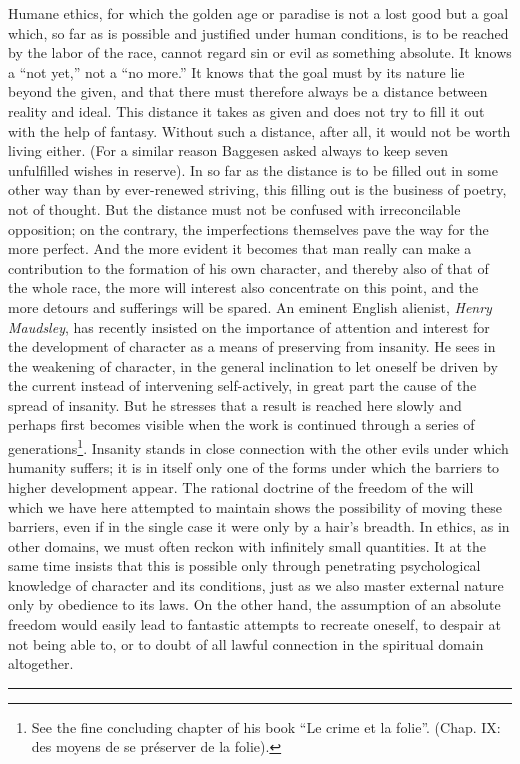\documentclass[12pt,a4paper,openany]{book}
\newcommand{\opage}[1]{\marginnote{\footnotesize\textit{[#1]}}}
\begin{document}
Humane ethics, for which the golden age or paradise is not a lost good but a
goal which, \opage{145}so far as is possible and justified under human
conditions, is to be reached by the labor of the race, cannot regard sin or
evil as something absolute. It knows a ``not yet,'' not a ``no more.'' It
knows that the goal must by its nature lie beyond the given, and that there
must therefore always be a distance between reality and ideal. This distance
it takes as given and does not try to fill it out with the help of fantasy.
Without such a distance, after all, it would not be worth living either.
(For a similar reason Baggesen asked always to keep seven unfulfilled wishes
in reserve). In so far as the distance is to be filled out in some other way
than by ever-renewed striving, this filling out is the business of poetry,
not of thought. But the distance must not be confused with irreconcilable
opposition; on the contrary, the imperfections themselves pave the way for
the more perfect. And the more evident it becomes that man really can make a
contribution to the formation of his own character, and thereby also of that
of the whole race, the more will interest also concentrate on this point,
and the more detours and sufferings will be spared. An eminent English
alienist, \emph{Henry Maudsley}, has recently insisted on the importance of
attention and interest for the development of character as a means of
preserving from insanity. He sees in the weakening of character, in the
general inclination to let oneself be driven by the current instead of
intervening self-actively, in great part the cause of the spread of
insanity. But he stresses that a \opage{146}result is reached here slowly
and perhaps first becomes visible when the work is continued through a
series of generations\footnote[1]{See the fine concluding chapter of his
book ``Le crime et la folie''. (Chap. IX: des moyens de se préserver de la
folie).}. Insanity stands in close connection with the other evils under
which humanity suffers; it is in itself only one of the forms under which
the barriers to higher development appear. The rational doctrine of the
freedom of the will which we have here attempted to maintain shows the
possibility of moving these barriers, even if in the single case it were
only by a hair's breadth. In ethics, as in other domains, we must often
reckon with infinitely small quantities. It at the same time insists that
this is possible only through penetrating psychological knowledge of
character and its conditions, just as we also master external nature only by
obedience to its laws. On the other hand, the assumption of an absolute
freedom would easily lead to fantastic attempts to recreate oneself, to
despair at not being able to, or to doubt of all lawful connection in the
spiritual domain altogether.

\begin{center}\rule{6em}{0.4pt}\end{center}
\end{document}
